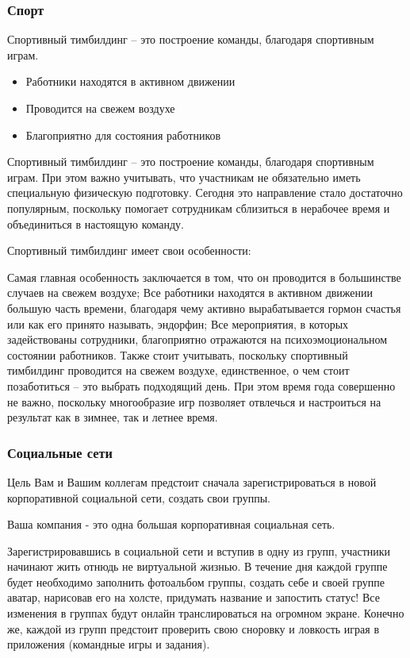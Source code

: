 \documentclass{../industrial-development}
\begin{document}
\begin{frame} \frametitle{Спорт}
\alert{Спортивный тимбилдинг} – это построение команды, благодаря спортивным играм.\\
\begin{itemize}
	\item Работники находятся в активном движении
	\item Проводится на свежем воздухе
	\item Благоприятно для состояния работников
\end{itemize}
\end{frame}

\lecturenotes

Спортивный тимбилдинг – это построение команды, благодаря спортивным играм. При этом важно учитывать, что участникам не обязательно иметь специальную физическую подготовку. Сегодня это направление стало достаточно популярным, поскольку помогает сотрудникам сблизиться в нерабочее время и объединиться в настоящую команду.

Спортивный тимбилдинг имеет свои особенности:

Самая главная особенность заключается в том, что он проводится в большинстве случаев на свежем воздухе;
Все работники находятся в активном движении большую часть времени, благодаря чему активно вырабатывается гормон счастья или как его принято называть, эндорфин;
Все мероприятия, в которых задействованы сотрудники, благоприятно отражаются на психоэмоциональном состоянии работников.
Также стоит учитывать, поскольку спортивный тимбилдинг проводится на свежем воздухе, единственное, о чем стоит позаботиться – это выбрать подходящий день. При этом время года совершенно не важно, поскольку многообразие игр позволяет отвлечься и настроиться на результат как в зимнее, так и летнее время.

\begin{frame} \frametitle{Социальные сети}
  \begin{block}{Цель}
Вам и Вашим коллегам предстоит сначала зарегистрироваться в новой корпоративной социальной сети, создать свои группы.
  \end{block}
Ваша компания - это одна большая корпоративная \alert{социальная сеть}.
\end{frame}

\lecturenotes

Зарегистрировавшись в социальной сети и вступив в одну из групп, участники начинают жить отнюдь не виртуальной жизнью. В течение дня каждой группе будет необходимо заполнить фотоальбом группы, создать себе и своей группе аватар, нарисовав его на холсте, придумать название и запостить статус!
Все изменения в группах будут онлайн транслироваться на огромном экране. Конечно же, каждой из групп предстоит проверить свою сноровку и ловкость играя в приложения (командные игры и задания).
\end{document}
